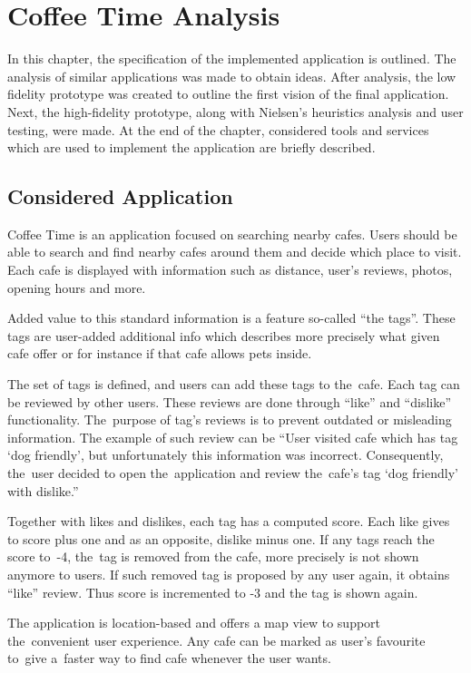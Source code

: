 \chapter{Coffee Time Analysis}
\label{ch:analysis}
In this chapter, the specification of the implemented application is outlined. The analysis of similar applications was made to obtain ideas.  After analysis, the low fidelity prototype was created to outline the first vision of the final application. Next, the high-fidelity prototype, along with Nielsen's heuristics analysis and user testing, were made. At the end of the chapter, considered tools and services which are used to implement the application are briefly described. 
\section{Considered Application}
Coffee Time is an application focused on searching nearby cafes. Users should be able to search and find nearby cafes around them and decide which place to visit. Each cafe is displayed with information such as distance, user's reviews, photos, opening hours and more. 

Added value to this standard information is a feature so-called ``the tags''. These tags are user-added additional info which describes more precisely what given cafe offer or for instance if that cafe allows pets inside. 

The set of tags is defined, and users can add these tags to the~cafe.  Each tag can be reviewed by other users. These reviews are done through ``like'' and ``dislike'' functionality. The~purpose of tag's reviews is to prevent outdated or misleading information.  
The example of such review can be ``User visited cafe which has tag `dog friendly', but unfortunately this information was incorrect. Consequently, the~user decided to open the~application and review the~cafe's tag `dog friendly' with dislike.''

Together with likes and dislikes, each tag has a computed score.  Each like gives to score plus one and as an opposite, dislike minus one. 
If any tags reach the score to~-4, the~tag is removed from the cafe, more precisely is not shown anymore to users. 
If such removed tag is proposed by any user again, it obtains ``like'' review. Thus score is incremented to -3 and the tag is shown again. 

The application is location-based and offers a map view to support the~convenient user experience. Any cafe can be marked as user's favourite to~give a~faster way to find cafe whenever the user wants. 

